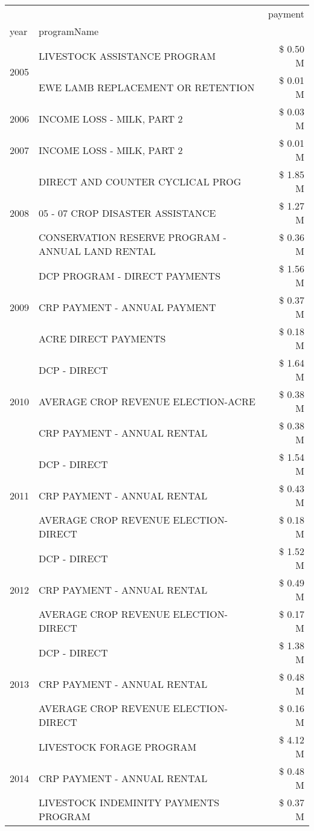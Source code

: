 \begin{tabular}{llr}
\toprule
 &  & payment \\
year & programName &  \\
\midrule
\multirow[t]{2}{*}{2005} & LIVESTOCK ASSISTANCE PROGRAM & \$ 0.50 M \\
 & EWE LAMB REPLACEMENT OR RETENTION & \$ 0.01 M \\
\cline{1-3}
2006 & INCOME LOSS - MILK, PART 2 & \$ 0.03 M \\
\cline{1-3}
2007 & INCOME LOSS - MILK, PART 2 & \$ 0.01 M \\
\cline{1-3}
\multirow[t]{3}{*}{2008} & DIRECT AND COUNTER CYCLICAL PROG & \$ 1.85 M \\
 & 05 - 07 CROP DISASTER ASSISTANCE & \$ 1.27 M \\
 & CONSERVATION RESERVE PROGRAM - ANNUAL LAND RENTAL & \$ 0.36 M \\
\cline{1-3}
\multirow[t]{3}{*}{2009} & DCP PROGRAM - DIRECT PAYMENTS & \$ 1.56 M \\
 & CRP PAYMENT - ANNUAL PAYMENT & \$ 0.37 M \\
 & ACRE DIRECT PAYMENTS & \$ 0.18 M \\
\cline{1-3}
\multirow[t]{3}{*}{2010} & DCP - DIRECT & \$ 1.64 M \\
 & AVERAGE CROP REVENUE ELECTION-ACRE & \$ 0.38 M \\
 & CRP PAYMENT - ANNUAL RENTAL & \$ 0.38 M \\
\cline{1-3}
\multirow[t]{3}{*}{2011} & DCP - DIRECT & \$ 1.54 M \\
 & CRP PAYMENT - ANNUAL RENTAL & \$ 0.43 M \\
 & AVERAGE CROP REVENUE ELECTION-DIRECT & \$ 0.18 M \\
\cline{1-3}
\multirow[t]{3}{*}{2012} & DCP - DIRECT & \$ 1.52 M \\
 & CRP PAYMENT - ANNUAL RENTAL & \$ 0.49 M \\
 & AVERAGE CROP REVENUE ELECTION-DIRECT & \$ 0.17 M \\
\cline{1-3}
\multirow[t]{3}{*}{2013} & DCP - DIRECT & \$ 1.38 M \\
 & CRP PAYMENT - ANNUAL RENTAL & \$ 0.48 M \\
 & AVERAGE CROP REVENUE ELECTION-DIRECT & \$ 0.16 M \\
\cline{1-3}
\multirow[t]{3}{*}{2014} & LIVESTOCK FORAGE PROGRAM & \$ 4.12 M \\
 & CRP PAYMENT - ANNUAL RENTAL & \$ 0.48 M \\
 & LIVESTOCK INDEMINITY PAYMENTS PROGRAM & \$ 0.37 M \\

\end{tabular}
